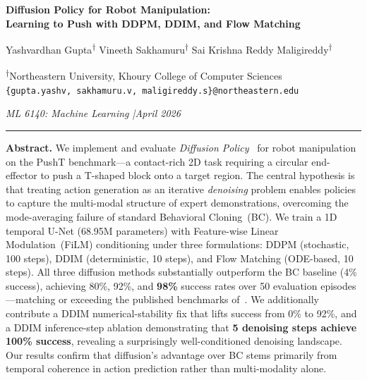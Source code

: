 \documentclass[10pt,letterpaper]{article}
\begin{document}
\begin{center}
  {\LARGE\bfseries\color{HeaderBlue}
    Diffusion Policy for Robot Manipulation: \\[4pt]
    Learning to Push with DDPM, DDIM, and Flow Matching
  }\par\vspace{12pt}
  {\large
    Yashvardhan Gupta\textsuperscript{$\dagger$}\quad
    Vineeth Sakhamuru\textsuperscript{$\dagger$}\quad
    Sai Krishna Reddy Maligireddy\textsuperscript{$\dagger$}
  }\par\vspace{6pt}
  {\normalsize
    \textsuperscript{$\dagger$}Northeastern University, Khoury College of Computer Sciences\\
    \texttt{\{gupta.yashv, sakhamuru.v, maligireddy.s\}@northeastern.edu}
  }\par\vspace{6pt}
  {\small\itshape ML 6140: Machine Learning \quad|\quad April 2026}
\end{center}

\vspace{8pt}
\noindent\rule{\linewidth}{1.2pt}
\vspace{-4pt}

\begin{center}
  \begin{minipage}{0.92\linewidth}
    \textbf{Abstract.}\;
    We implement and evaluate \textit{Diffusion Policy}~\citep{chi2023diffusion} for
    robot manipulation on the PushT benchmark---a contact-rich 2D task requiring a
    circular end-effector to push a T-shaped block onto a target region.
    The central hypothesis is that treating action generation as an iterative
    \textit{denoising} problem enables policies to capture the multi-modal structure
    of expert demonstrations, overcoming the mode-averaging failure of standard
    Behavioral Cloning~(BC).
    We train a 1D temporal U-Net (68.95M parameters) with Feature-wise Linear
    Modulation~(FiLM) conditioning under three formulations: DDPM (stochastic, 100
    steps), DDIM (deterministic, 10 steps), and Flow Matching (ODE-based, 10 steps).
    All three diffusion methods substantially outperform the BC baseline (4\%
    success), achieving 80\%, 92\%, and \textbf{98\%} success rates over 50 evaluation
    episodes---matching or exceeding the published benchmarks of~\citet{chi2023diffusion}.
    We additionally contribute a DDIM numerical-stability fix that lifts success from
    0\% to 92\%, and a DDIM inference-step ablation demonstrating that
    \textbf{5 denoising steps achieve 100\% success}, revealing a
    surprisingly well-conditioned denoising landscape.
    Our results confirm that diffusion's advantage over BC stems primarily from
    temporal coherence in action prediction rather than multi-modality alone.
  \end{minipage}
\end{center}
\end{document}
